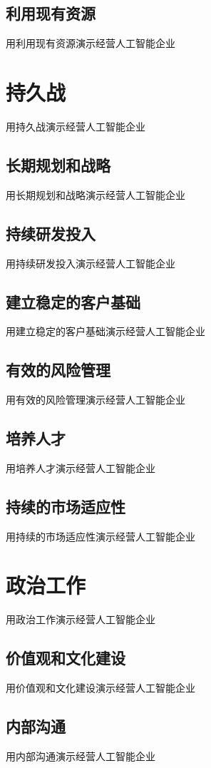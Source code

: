\documentclass[12pt]{book}
\begin{document}
\subsection{利用现有资源}
用利用现有资源演示经营人工智能企业

\section{持久战}
用持久战演示经营人工智能企业

\subsection{长期规划和战略}
用长期规划和战略演示经营人工智能企业

\subsection{持续研发投入}
用持续研发投入演示经营人工智能企业

\subsection{建立稳定的客户基础}
用建立稳定的客户基础演示经营人工智能企业

\subsection{有效的风险管理}
用有效的风险管理演示经营人工智能企业

\subsection{培养人才}
用培养人才演示经营人工智能企业

\subsection{持续的市场适应性}
用持续的市场适应性演示经营人工智能企业

\section{政治工作}
用政治工作演示经营人工智能企业
\subsection{价值观和文化建设}
用价值观和文化建设演示经营人工智能企业

\subsection{内部沟通}
用内部沟通演示经营人工智能企业
\end{document}
